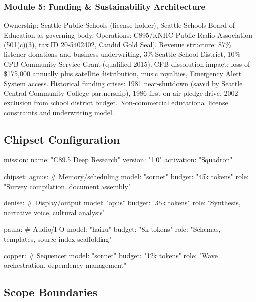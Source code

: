 \documentclass[11pt,letterpaper]{article}
\begin{document}
\subsubsection{Module 5: Funding \& Sustainability Architecture}
Ownership: Seattle Public Schools (license holder), Seattle Schools Board of Education as governing body. Operations: C895/KNHC Public Radio Association (501(c)(3), tax ID 20-5402402, Candid Gold Seal). Revenue structure: 87\% listener donations and business underwriting, 3\% Seattle School District, 10\% CPB Community Service Grant (qualified 2015). CPB dissolution impact: loss of \$175,000 annually plus satellite distribution, music royalties, Emergency Alert System access. Historical funding crises: 1981 near-shutdown (saved by Seattle Central Community College partnership), 1986 first on-air pledge drive, 2002 exclusion from school district budget. Non-commercial educational license constraints and underwriting model.

\subsection{Chipset Configuration}

\begin{asciibox}
mission:
  name: "C89.5 Deep Research"
  version: "1.0"
  activation: "Squadron"

chipset:
  agnus:    # Memory/scheduling
    model: "sonnet"
    budget: "45k tokens"
    role: "Survey compilation, document assembly"

  denise:   # Display/output
    model: "opus"
    budget: "35k tokens"
    role: "Synthesis, narrative voice, cultural analysis"

  paula:    # Audio/I-O
    model: "haiku"
    budget: "8k tokens"
    role: "Schemas, templates, source index scaffolding"

  copper:   # Sequencer
    model: "sonnet"
    budget: "12k tokens"
    role: "Wave orchestration, dependency management"
\end{asciibox}

\subsection{Scope Boundaries}
\end{document}
